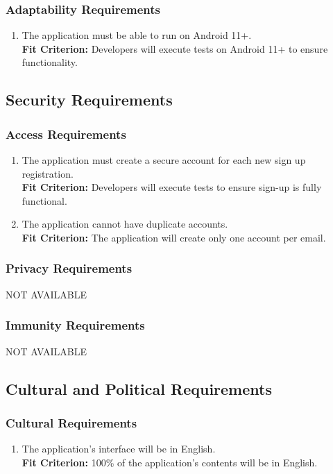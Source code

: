 \documentclass[12pt,letterpaper]{article}
\begin{document}
\subsubsection{Adaptability Requirements}
\begin{enumerate}[resume*] 
	\item The application must be able to run on Android 11+. \\
	{\textbf{Fit Criterion:} Developers will execute tests on Android 11+ to ensure functionality. }
\end{enumerate}
\subsection{Security Requirements}
\subsubsection{Access Requirements}
\begin{enumerate}[{SE}1.] 
	\item The application must create a secure account for each new sign up registration. \\
	{\textbf{Fit Criterion:} Developers will execute tests to ensure sign-up is fully functional. }
	\item The application cannot have duplicate accounts.  \\
	{\textbf{Fit Criterion:} The application will create only one account per email. }
\end{enumerate}
\subsubsection{Privacy Requirements}
NOT AVAILABLE
\subsubsection{Immunity Requirements}
NOT AVAILABLE
\subsection{Cultural and Political Requirements}
\subsubsection{Cultural Requirements}
\begin{enumerate}[{CU}1] 
	\item The application's interface will be in English. \\
	{\textbf{Fit Criterion:} 100\% of the application's contents will be in English. }
\end{enumerate}
\end{document}
